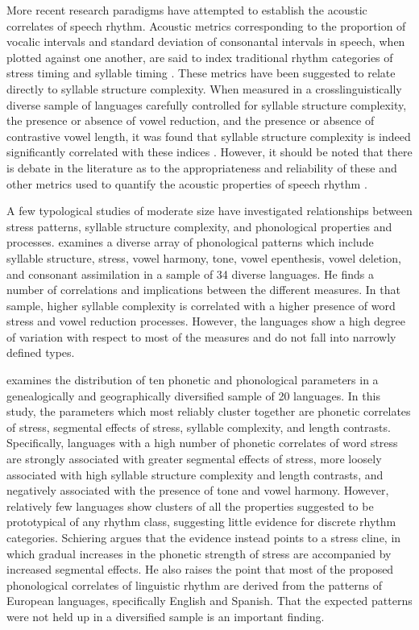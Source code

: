   More recent research paradigms have attempted to establish the acoustic correlates of speech rhythm. Acoustic metrics corresponding to the proportion of vocalic intervals and standard deviation of consonantal intervals in speech, when plotted against one another, are said to index traditional rhythm categories of stress timing and syllable timing \citep{RamusEtAl1999}. These metrics have been suggested to relate directly to syllable structure complexity. When measured in a crosslinguistically diverse sample of languages carefully controlled for syllable structure complexity, the presence or absence of vowel reduction, and the presence or absence of contrastive vowel length, it was found that syllable structure complexity is indeed significantly correlated with these indices \citep{EasterdayEtAl2011}. However, it should be noted that there is debate in the literature as to the appropriateness and reliability of these and other metrics used to quantify the acoustic properties of speech rhythm \citep{WigetEtAl2010}.

  A few typological studies of moderate size have investigated relationships between stress patterns, syllable structure complexity, and phonological properties and processes. \citet{Auer1993} examines a diverse array of phonological patterns which include syllable structure, stress, vowel harmony, tone, vowel epenthesis, vowel deletion, and consonant assimilation in a sample of 34 diverse languages. He finds a number of correlations and implications between the different measures. In that sample, higher syllable complexity is correlated with a higher presence of word stress and vowel reduction processes. However, the languages show a high degree of variation with respect to most of the measures and do not fall into narrowly defined types. 

  \citet{Schiering2007} examines the distribution of ten phonetic and phonological parameters in a genealogically and geographically diversified sample of 20 languages. In this study, the parameters which most reliably cluster together are phonetic correlates of stress, segmental effects of stress, syllable complexity, and length contrasts. Specifically, languages with a high number of phonetic correlates of word stress are strongly associated with greater segmental effects of stress, more loosely associated with high syllable structure complexity and length contrasts, and negatively associated with the presence of tone and vowel harmony. However, relatively few languages show clusters of all the properties suggested to be prototypical of any rhythm class, suggesting little evidence for discrete rhythm categories. Schiering argues that the evidence instead points to a stress cline, in which gradual increases in the phonetic strength of stress are accompanied by increased segmental effects. He also raises the point that most of the proposed phonological correlates of linguistic rhythm are derived from the patterns of European languages, specifically English and Spanish. That the expected patterns were not held up in a diversified sample is an important finding.

